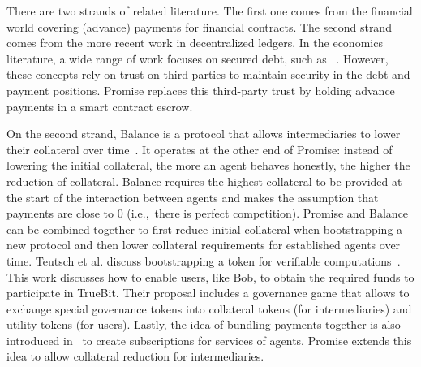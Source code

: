 \documentclass[runningheads]{llncs}
\newcommand{\sys}{Promise\xspace}
\newcommand{\tolgu}[1]{\todo[linecolor=yellow,backgroundcolor=yellow!25,bordercolor=yellow,inline,caption={}]{Todo for Lewis: #1}}
\begin{document}


There are two strands of related literature.
The first one comes from the financial world covering (advance) payments for financial contracts.
The second strand comes from the more recent work in decentralized ledgers.
In the economics literature, a wide range of work focuses on secured debt, such as ~\cite{scott1977bankruptcy,stulz1985analysis}.
However, these concepts rely on trust on third parties to maintain security in the debt and payment positions.
\sys replaces this third-party trust by holding advance payments in a smart contract escrow.

On the second strand, Balance is a protocol that allows intermediaries to lower their collateral over time~\cite{Harz2019Balance}.
It operates at the other end of \sys: instead of lowering the initial collateral, the more an agent behaves honestly, the higher the reduction of collateral.
Balance requires the highest collateral to be provided at the start of the interaction between agents and makes the assumption that payments are close to 0 (i.e.,\ there is perfect competition).
\sys and Balance can be combined together to first reduce initial collateral when bootstrapping a new protocol and then lower collateral requirements for established agents over time.
Teutsch et al. discuss bootstrapping a token for verifiable computations~\cite{Teutsch2019Boostrap}.
This work discusses how to enable users, like Bob, to obtain the required funds to participate in TrueBit.
Their proposal includes a governance game that allows to exchange special governance tokens into collateral tokens (for intermediaries) and utility tokens (for users).
Lastly, the idea of bundling payments together is also introduced in~\cite{Berg2018} to create subscriptions for services of agents.
\sys extends this idea to allow collateral reduction for intermediaries.
\end{document}
